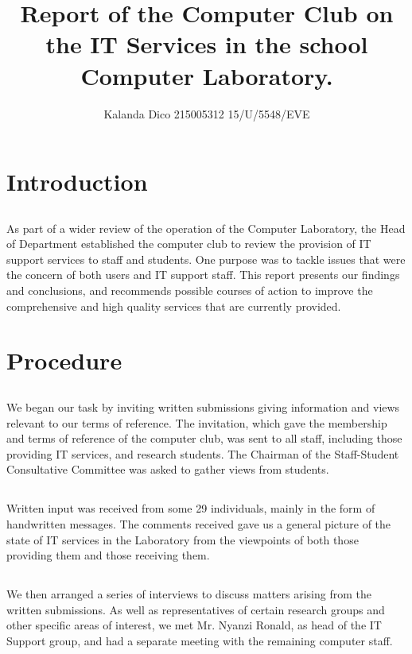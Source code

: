 \documentclass{article}
\begin{document}
\title{Report of the Computer Club on the IT Services in the school Computer Laboratory.}
\author{Kalanda Dico 215005312  15/U/5548/EVE}
\maketitle{}

\section{Introduction}
\subsection{}
As part of a wider review of the operation of the Computer Laboratory, the Head of Department established the computer club to review the provision of IT support services to staff and students. One purpose was to tackle issues that were the concern of both users and IT support staff. This report presents our findings and conclusions, and recommends possible courses of action to improve the comprehensive and high quality services that are currently provided.

\section{Procedure}
\subsection{}
We began our task by inviting written submissions giving information and views relevant to our terms of reference. The invitation, which gave the membership and terms of reference of the computer club, was sent to all staff, including those providing IT services, and research students. The Chairman of the Staff-Student Consultative Committee was asked to gather views from students.

\subsection{}
Written input was received from some 29 individuals, mainly in the form of handwritten messages. The comments received gave us a general picture of the state of IT services in the Laboratory from the viewpoints of both those providing them and those receiving them.

\subsection{}
We then arranged a series of interviews to discuss matters arising from the written submissions. As well as representatives of certain research groups and other specific areas of interest, we met Mr. Nyanzi Ronald, as head of the IT Support group, and had a separate meeting with the remaining computer staff.
\end{document}
